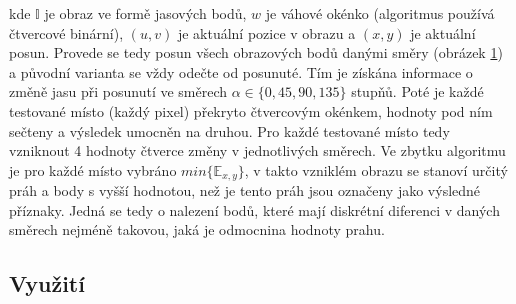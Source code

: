 \begin{figure}[!ht] 
	 	\label{Moravec_posun}
\end{figure}
	
\noindent kde  $\mathbb{I}$ je obraz ve formě jasových bodů, $w$ je váhové okénko (algoritmus používá čtvercové binární), $(u,v)$ je aktuální pozice v obrazu a $(x,y)$ je aktuální posun. Provede se tedy posun všech obrazových bodů danými směry (obrázek \ref{Moravec_posun}) a  původní varianta se vždy odečte od posunuté. Tím je získána informace o změně jasu při posunutí ve směrech  $\alpha \in \{0, 45, 90, 135\}$ stupňů. Poté je každé testované místo (každý pixel) překryto čtvercovým okénkem, hodnoty pod ním sečteny a výsledek umocněn na druhou. Pro každé testované místo tedy vzniknout 4 hodnoty čtverce změny v jednotlivých směrech. Ve zbytku algoritmu je pro každé místo vybráno $min\{\mathbb{E}_{x,y}\}$, v takto vzniklém obrazu se stanoví určitý práh a body s vyšší hodnotou, než je tento práh jsou označeny jako výsledné příznaky. Jedná se tedy o nalezení bodů, které mají diskrétní diferenci v daných směrech nejméně takovou, jaká je odmocnina
hodnoty prahu.

\subsection{Využití}

